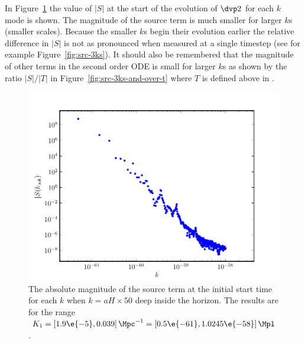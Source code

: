 In Figure~\ref{fig:src-kinit} the value of $|S|$ at the start of the evolution
of $\dvp2$ for
each $k$ mode is shown. The magnitude of the source term is much smaller for
larger $k$s (smaller
scales). 
Because the smaller $k$s begin their evolution earlier the relative difference
in $|S|$ is not as
pronounced when measured at a single timestep (see for example
Figure~\ref{fig:src-3ks}).
It should also be remembered that the magnitude of other terms in the second
order ODE is
small for larger $k$s as shown by the ratio $|S|/|T|$ in
Figure~\ref{fig:src-3ks-and-over-t}
where $T$ is defined above in .
\begin{figure}
\includegraphics[scale=0.8]{numerical/graphs/src_kinit_log}
 \caption{The absolute magnitude of the source term at the initial start time
for each $k$ when
$k = aH \times 50$ deep inside the horizon. The results are for the range
$K_1=\left[ 1.9\e{-5},
0.039 \right] \Mpc^{-1}= \left[0.5\e{-61}, 1.0245\e{-58}\right]\Mpl$.}
\label{fig:src-kinit}
\end{figure}
% 

